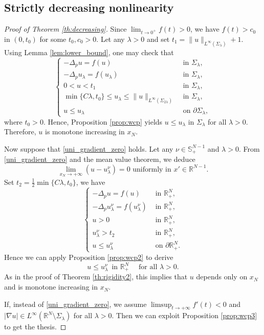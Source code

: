 \documentclass[reqno]{amsart}
\theoremstyle{plain}
\theoremstyle{definition}
\theoremstyle{remark}
\begin{document}
	\subsection{Strictly decreasing nonlinearity}
	\begin{proof}[Proof of Theorem \ref{th:decreasing}]
		Since $\lim_{t\to0^+} f(t) > 0$, we have $f(t) > c_0$ in $(0, t_0)$ for some $t_0,c_0>0$.		
		Let any $\lambda>0$ and set $t_1=\|u\|_{L^\infty(\Sigma_\lambda)} + 1$.
		Using Lemma \ref{lem:lower_bound}, one may check that
		\[
		\begin{cases}
			-\Delta_p u = f(u) &\text{ in } \Sigma_\lambda,\\
			-\Delta_p u_\lambda = f(u_\lambda) &\text{ in } \Sigma_\lambda,\\
			0<u<t_1 &\text{ in } \Sigma_\lambda,\\
			\min\{C \lambda, t_0\} \le u_\lambda\le\|u\|_{L^\infty(\Sigma_{2\lambda})} &\text{ in } \Sigma_\lambda,\\
			u \le u_\lambda &\text{ on } \partial\Sigma_\lambda,
		\end{cases}
		\]
		where $t_0>0$.
		Hence, Proposition \ref{prop:wcp} yields $u\leq u_\lambda$ in $\Sigma_\lambda$ for all $\lambda>0$. Therefore, $u$ is monotone increasing in $x_N$.
		
		Now suppose that \eqref{uni_gradient_zero} holds. Let any $\nu\in \mathbb{S}^{N-1}_+$ and $\lambda>0$. From \eqref{uni_gradient_zero} and the mean value theorem, we deduce
		\[
		\lim_{x_N\to+\infty} (u-u_\lambda^\nu) = 0 \text{ uniformly in } x'\in\mathbb{R}^{N-1}.
		\]
		Set $t_2 = \frac{1}{2}\min\{C \lambda, t_0\}$, we have
		\[
		\begin{cases}
			-\Delta_p u = f(u) &\text{ in } \mathbb{R}^N_+,\\
			-\Delta_p u_\lambda^\nu = f(u_\lambda^\nu) &\text{ in } \mathbb{R}^N_+,\\
			u>0 &\text{ in } \mathbb{R}^N_+,\\
			u_\lambda^\nu>t_2 &\text{ in } \mathbb{R}^N_+,\\
			u \le u_\lambda^\nu &\text{ on } \partial\mathbb{R}^N_+.
		\end{cases}
		\]
		Hence we can apply Proposition \ref{prop:wcp2} to derive
		\[
		u \le u_\lambda^\nu \,\text{ in } \mathbb{R}^N_+ \quad\text{ for all } \lambda>0.
		\]
		As in the proof of Theorem \ref{th:rigidity2}, this implies that $u$ depends only on $x_N$ and is monotone increasing in $x_N$.
		
		If, instead of \eqref{uni_gradient_zero}, we assume $\limsup_{t\to+\infty} f'(t) < 0$ and $|\nabla u| \in L^\infty(\mathbb{R}^N\setminus\Sigma_\lambda)$ for all $\lambda>0$. Then we can exploit Proposition \ref{prop:wcp3} to get the thesis.
	\end{proof}
	
\end{document}
